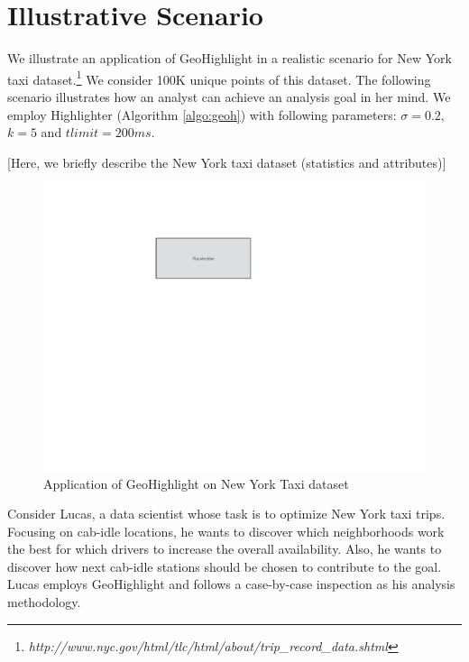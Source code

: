 \section{Illustrative Scenario}\label{sec:scenarios}
We illustrate an application of {\sc GeoHighlight} in a realistic scenario for New York taxi dataset.\footnote{\it http://www.nyc.gov/html/tlc/html/about/trip_record_data.shtml} We consider 100K unique points of this dataset. The following scenario illustrates how an analyst can achieve an analysis goal in her mind. We employ {\sc Highlighter} (Algorithm \ref{algo:geoh}) with following parameters: $\sigma = 0.2$, $k = 5$ and $tlimit = 200ms$. 

\vspace{5pt}
 [Here, we briefly describe the New York taxi dataset (statistics and attributes)]

\begin{figure}
  \centering
  \includegraphics[width=\columnwidth]{figs/placeholder}
\caption{Application of {\sc GeoHighlight} on New York Taxi dataset}
\label{fig:app}
\end{figure}

\vspace{5pt}
Consider Lucas, a data scientist whose task is to optimize New York taxi trips. Focusing on cab-idle locations, he wants to discover which neighborhoods work the best for which drivers to increase the overall availability. Also, he wants to discover how next cab-idle stations should be chosen to contribute to the goal. Lucas employs {\sc GeoHighlight} and follows a case-by-case inspection as his analysis methodology.

